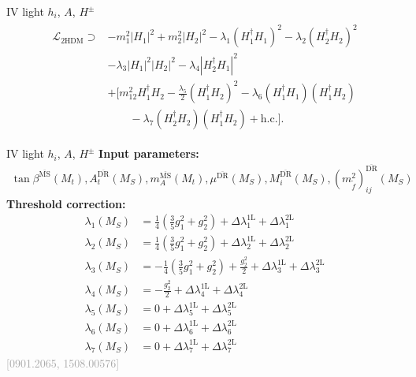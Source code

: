 \documentclass[hyperref={pdfpagelabels=false},ngerman]{beamer}
\newcommand{\MS}{\ensuremath{M_S}}
\newcommand{\bigcite}[1]{\textcolor{darkgray}{[#1]}}
\renewcommand{\emph}{\textbf}
\newcommand{\DRbar}{\ensuremath{\overline{\text{DR}}}}
\newcommand{\MSbar}{\ensuremath{\overline{\text{MS}}}}
\newcommand{\THDM}{\ensuremath{\text{2HDM}}\xspace}
\newcommand{\hc}{\ensuremath{\text{h.c.}}}
\newcommand{\Lag}{\ensuremath{\mathcal{L}}}
\newcommand{\DlTHDM}[2]{\Delta\lambda_{#1}^{\text{#2L}}}
\begin{document}
\begin{frame}[noframenumbering]{IV light $h_i$, $A$, $H^{\pm}$}
\begin{align*}
\begin{split}
  \Lag_\THDM \supset
  &-m_1^2 |H_1|^2 + m_2^2 |H_2|^2
  - \lambda_1 (H_1^\dagger H_1)^2
  - \lambda_2 (H_2^\dagger H_2)^2 \\
  &- \lambda_3 |H_1|^2 |H_2|^2
  - \lambda_4 |H_2^\dagger H_1|^2\\
  &+\Bigg[ m_{12}^2 H_1^\dagger H_2
  - \frac{\lambda_5}{2} (H_1^\dagger H_2)^2
  - \lambda_6 (H_1^\dagger H_1)(H_1^\dagger H_2)\\
  &\qquad- \lambda_7 (H_2^\dagger H_2)(H_1^\dagger H_2)
  + \hc \Bigg] .
\end{split}
\end{align*}
\end{frame}

\begin{frame}[noframenumbering]{IV light $h_i$, $A$, $H^{\pm}$}
  \emph{Input parameters:}
  \begin{align*}
  \tan\beta^{\MSbar}(M_t), A_t^{\DRbar}(\MS), m_A^{\MSbar}(M_t),
  \mu^{\DRbar}(\MS), M_i^{\DRbar}(\MS),
  (m_{\tilde{f}}^2)^{\DRbar}_{ij}(\MS)
  \end{align*}
  \emph{Threshold correction:}
  \begin{align*}
    \lambda_1(\MS) &= \frac{1}{4}\left(\frac{3}{5} g_1^2 + g_2^2\right) + \DlTHDM{1}{1} + \DlTHDM{1}{2}\\
    \lambda_2(\MS) &= \frac{1}{4}\left(\frac{3}{5} g_1^2 + g_2^2\right) + \DlTHDM{2}{1} + \DlTHDM{2}{2}\\
    \lambda_3(\MS) &= -\frac{1}{4} \left(\frac{3}{5}g_1^2 + g_2^2\right) + \frac{g_2^2}{2} + \DlTHDM{3}{1} + \DlTHDM{3}{2}\\
    \lambda_4(\MS) &= -\frac{g_2^2}{2} + \DlTHDM{4}{1} + \DlTHDM{4}{2}\\
    \lambda_5(\MS) &= 0 + \DlTHDM{5}{1} + \DlTHDM{5}{2}\\
    \lambda_6(\MS) &= 0 + \DlTHDM{6}{1} + \DlTHDM{6}{2}\\
    \lambda_7(\MS) &= 0 + \DlTHDM{7}{1} + \DlTHDM{7}{2}
  \end{align*}
  \hfill\bigcite{0901.2065, 1508.00576}
\end{frame}
\end{document}
